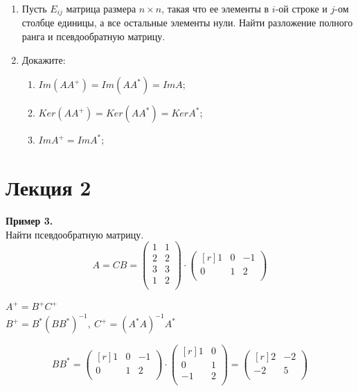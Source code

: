 \documentclass[12pt]{article}
\theoremstyle{definition}
\numberwithin{equation}{section}
\begin{document}
\begin{enumerate}
		\item Пусть $E_{ij}$ матрица размера $n\times n$, такая что ее элементы в $i$-ой строке и $j$-ом столбце единицы, а все остальные элементы нули. Найти разложение полного ранга и псевдообратную матрицу.
		\item Докажите:\begin{enumerate}
			\item $Im(AA^+) = Im(AA^*) = Im A$;
			\item $Ker (AA^+) = Ker (AA^*) = Ker A^*$;
			\item $Im A^+ = Im A^*$;
		\end{enumerate}
	\end{enumerate}
	\section *{Лекция 2}
	\noindent \textbf{Пример 3.}\\
	Найти псевдообратную матрицу.\\
	\[A = CB = \begin{pmatrix}
	1 & 1 \\         
	2 & 2 \\
	3 & 3 \\
	1 & 2 \\
	\end{pmatrix} \cdot \begin{pmatrix}[r]
	1 & 0 & -1 \\         
	0 & 1 & 2 \\
	\end{pmatrix}\]
	\begin{center}
		$A^+=B^+C^+$\\
		$B^+=B^*(BB^*)^{-1}, ~C^+=(A^*A)^{-1}A^*$\\
	\end{center}
	\[BB^* = \begin{pmatrix}[r]
	1 & 0 & -1 \\         
	0 & 1 & 2 \\
	\end{pmatrix} \cdot \begin{pmatrix}[r]
	1 & 0 \\         
	0 & 1 \\
	-1 & 2 \\
	\end{pmatrix} =  \begin{pmatrix}[r]
	2 & -2 \\         
	-2 & 5 \\
	\end{pmatrix}\]\\
\end{document}
